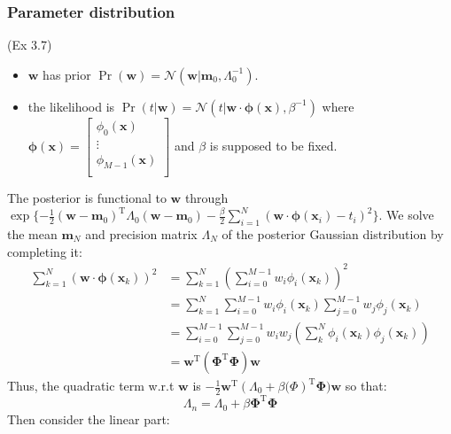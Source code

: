 \subsubsection{Parameter distribution}
(Ex 3.7) 
\begin{itemize}
\item $\mathbf{w}$ has prior $\Pr(\mathbf{w})=\mathcal{N}(\mathbf{w}\vert{}\mathbf{m}_{0},\Lambda_{0}^{-1})$.
\item the likelihood is $\Pr(t\vert\mathbf{w})=\mathcal{N}(t\vert{}\mathbf{w}\cdot\boldsymbol{\phi}(\mathbf{x}),\beta^{-1})$ where $\boldsymbol{\phi}(\mathbf{x})=\begin{bmatrix}\phi_{0}(\mathbf{x})\\\vdots\\\phi_{M-1}(\mathbf{x})\\\end{bmatrix}$ and $\beta$ is supposed to be fixed.
\end{itemize}
The posterior is functional to $\mathbf{w}$ through $\exp{}\{-\frac{1}{2}(\mathbf{w}-\mathbf{m}_{0})^{\mathrm{T}}\Lambda_{0}(\mathbf{w}-\mathbf{m}_{0})-\frac{\beta}{2}\sum_{i=1}^{N}(\mathbf{w}\cdot\boldsymbol{\phi}(\mathbf{x}_i)-t_i)^2\}$. 
We solve the mean $\mathbf{m}_N$ and precision matrix $\Lambda_N$ of the posterior Gaussian distribution by completing it:
\begin{equation}
\begin{split}
\sum_{k=1}^{N}(\mathbf{w}\cdot\boldsymbol{\phi}(\mathbf{x}_k))^2&=\sum_{k=1}^{N}(\sum_{i=0}^{M-1}w_{i}\phi_{i}(\mathbf{x}_k))^2\\
&=\sum_{k=1}^{N}\sum_{i=0}^{M-1}w_{i}\phi_{i}(\mathbf{x}_k)\sum_{j=0}^{M-1}w_{j}\phi_{j}(\mathbf{x}_k)\\
&=\sum_{i=0}^{M-1}\sum_{j=0}^{M-1}w_{i}w_{j}(\sum_{k}^{N}\phi_{i}(\mathbf{x}_k)\phi_{j}(\mathbf{x}_k))\\
&=\mathbf{w}^{\mathrm{T}}(\boldsymbol{\Phi}^{\mathrm{T}}\boldsymbol{\Phi})\mathbf{w}
\end{split}
\end{equation}
Thus, the quadratic term w.r.t $\mathbf{w}$ is $-\frac{1}{2}\mathbf{w}^{\mathrm{T}}(\Lambda_{0}+\beta\boldsymbol(\Phi)^{\mathrm{T}}\boldsymbol{\Phi})\mathbf{w}$ so that:
\begin{equation}
\Lambda_{n}=\Lambda_{0}+\beta\boldsymbol{\Phi}^{\mathrm{T}}\boldsymbol{\Phi}
\label{eqn:onlinelearninggaussianprecision}
\end{equation}
Then consider the linear part:
